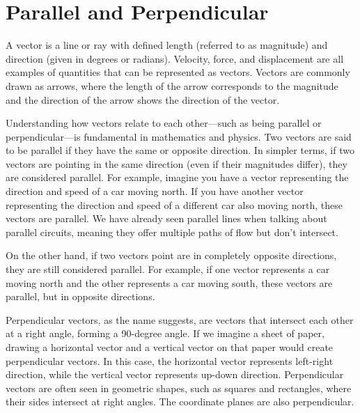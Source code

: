 \chapter{Parallel and Perpendicular}
A vector is a line or ray with defined length (referred to as magnitude) and direction (given in degrees or radians). Velocity, force, and displacement are all examples of quantities that can be represented as vectors. Vectors are commonly drawn as arrows, where the length of the arrow corresponds to the magnitude and the direction of the arrow shows the direction of the vector.

Understanding how vectors relate to each other—such as being parallel or perpendicular—is fundamental in mathematics and physics.
Two vectors are said to be parallel if they have the same or opposite
direction. In simpler terms, if two vectors are pointing in the same
direction (even if their magnitudes differ), they are considered
parallel. For example, imagine you have a vector representing the
direction and speed of a car moving north. If you have another vector
representing the direction and speed of a different car also moving
north, these vectors are parallel. We have already seen parallel lines 
when talking about parallel circuits, meaning they offer multiple paths 
of flow but don't intersect.

\begin{center}
\end{center}

On the other hand, if two vectors point are in completely opposite
directions, they are still considered parallel. For example, if one
vector represents a car moving north and the other represents a car
moving south, these vectors are parallel, but in opposite directions.

Perpendicular vectors, as the name suggests, are vectors that
intersect each other at a right angle, forming a 90-degree angle. If
we imagine a sheet of paper, drawing a horizontal vector and a
vertical vector on that paper would create perpendicular vectors. In
this case, the horizontal vector represents left-right direction,
while the vertical vector represents up-down direction. Perpendicular
vectors are often seen in geometric shapes, such as squares and
rectangles, where their sides intersect at right angles. The coordinate planes
are also perpendicular.
\begin{center}
\end{center}

